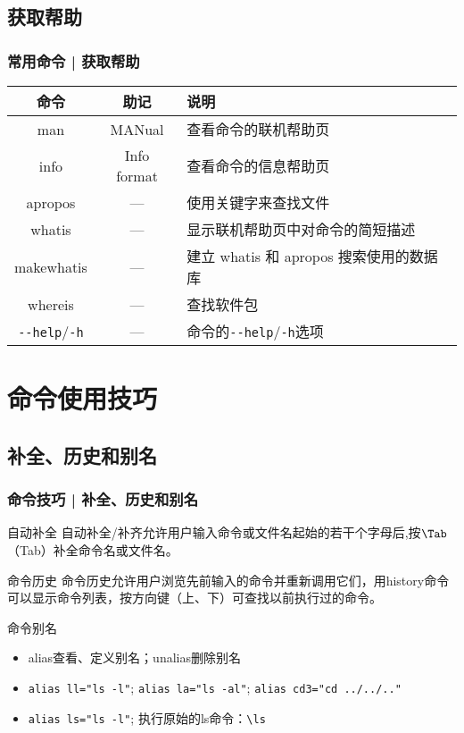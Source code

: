 \subsection{获取帮助}
\begin{frame}[fragile]
  \frametitle{常用命令 | \alert{获取帮助}}
  \begin{table}
    \centering
    \begin{tabularx}{0.9\textwidth}{ccX}
      \hline
      \rowcolor{blue!50}命令 & 助记 & 说明\\
      \hline
      man & MANual & 查看命令的联机帮助页\\
      info & Info format & 查看命令的信息帮助页\\
      apropos & --- & 使用关键字来查找文件\\
      whatis & --- & 显示联机帮助页中对命令的简短描述\\
      makewhatis & --- & 建立 whatis 和 apropos 搜索使用的数据库\\
      whereis & --- & 查找软件包\\
      \verb|--help|/\verb|-h| & --- & 命令的\verb|--help|/\verb|-h|选项\\
      \hline
    \end{tabularx}
  \end{table}
\end{frame}


\section{命令使用技巧}
\subsection{补全、历史和别名}
\begin{frame}[fragile]
  \frametitle{命令技巧 | 补全、历史和别名}
  \begin{block}{自动补全}
    自动补全/补齐允许用户输入命令或文件名起始的若干个字母后,按$\Tab$（\alert{Tab}）补全命令名或文件名。
  \end{block}
  \pause
  \begin{block}{命令历史}
    命令历史允许用户浏览先前输入的命令并重新调用它们，用\alert{history}命令可以显示命令列表，按方向键（上、下）可查找以前执行过的命令。
  \end{block}
  \pause
  \begin{block}{命令别名}
    \begin{itemize}
      \item \alert{alias}查看、定义别名；unalias删除别名
      \item \verb|alias ll="ls -l"|; \quad \verb|alias la="ls -al"|; \verb|alias cd3="cd ../../.."|
      \item \verb|alias ls="ls -l"|; 执行原始的ls命令：\verb|\ls|
    \end{itemize}
  \end{block}
\end{frame}

